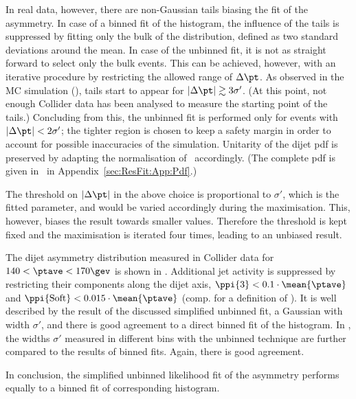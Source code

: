 In real data, however, there are non-Gaussian tails biasing the fit of the asymmetry.
In case of a binned fit of the histogram, the influence of the tails is suppressed by
fitting only the bulk of the distribution, defined as two standard deviations around the mean.
In case of the unbinned fit, it is not as straight forward to select only the bulk events.
This can be achieved, however, with an iterative procedure by restricting the allowed range of \mbox{$\Delta\pt$}.
As observed in the MC simulation (), tails start to appear for \mbox{$|\Delta\pt| \gtrsim 3\sigma'$}.
(At this point, not enough Collider data has been analysed to measure the starting point of the tails.)
Concluding from this, the unbinned fit is performed only for events with \mbox{$|\Delta\pt| < 2\sigma'$}; the tighter region is chosen to keep a safety margin in order to account for possible inaccuracies of the simulation.
Unitarity of the dijet pdf is preserved by adapting the normalisation of~ accordingly.
(The complete pdf is given in~ in Appendix~\ref{sec:ResFit:App:Pdf}.)

The threshold on $|\Delta\pt|$ in the above choice is proportional to $\sigma'$, which is the fitted parameter, and would be varied accordingly during the maximisation.
This, however, biases the result towards smaller values.
Therefore the threshold is kept fixed and the maximisation is iterated
four times, leading to an unbiased result.

The dijet asymmetry distribution measured in Collider data for \mbox{$140 <
  \ptave < 170\gev$} is shown in
.
Additional jet activity is suppressed by restricting their \pt components
along the dijet axis, \mbox{$\ppi{3} < 0.1\cdot\mean{\ptave}$} and
\mbox{$\ppi{\text{Soft}} < 0.015\cdot\mean{\ptave}$} (comp.  for
a definition of \pp).
It is well described by the result of the discussed simplified unbinned fit, \ie a Gaussian with width $\sigma'$, and there is good agreement to a direct binned fit of the histogram.
In , the widths $\sigma'$ measured in different \ptave bins with the unbinned technique are further compared to the results of binned fits.
Again, there is good agreement.

In conclusion, the simplified unbinned likelihood fit of the asymmetry performs equally to a binned fit of corresponding histogram.



